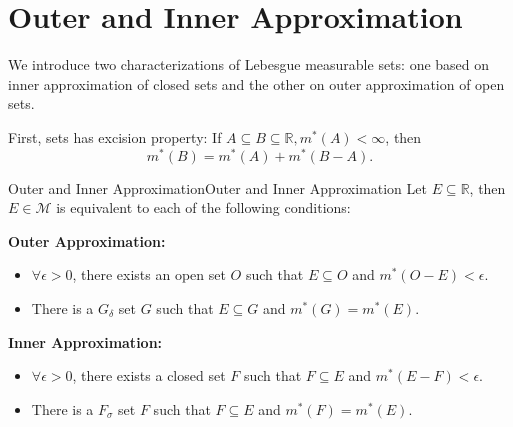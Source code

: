 \documentclass[../main.tex]{subfiles}
\begin{document}
\section{Outer and Inner Approximation}

We introduce two characterizations of Lebesgue measurable sets: one based on inner approximation of closed sets and the other on outer approximation of open sets.

First, sets has excision property: If $A \subseteq B \subseteq \mathbb{R}, m^*(A) < \infty $, then
\begin{equation*}
	m^*(B) = m^*(A) + m^*(B - A).
\end{equation*}

\begin{theorem}{Outer and Inner Approximation}{Outer and Inner Approximation}
Let $E \subseteq \mathbb{R}$, then $E\in \mathcal{M}$ is equivalent to each of the following conditions:

\textbf{Outer Approximation:}
\begin{itemize}
\item $\forall \epsilon>0$, there exists an open set $O$ such that $E \subseteq O$ and $m^*(O-E) < \epsilon$.
\item There is a $G_{\delta}$ set $G$ such that $E \subseteq G$ and $m^*(G) = m^*(E)$.
\end{itemize}

\textbf{Inner Approximation:}
\begin{itemize}
	\item $\forall \epsilon>0$, there exists a closed set $F$ such that $F \subseteq E$ and $m^*(E-F) < \epsilon$.
	\item There is a $F_{\sigma }$ set $F$ such that $F \subseteq E$ and $m^*(F) = m^*(E)$.
\end{itemize}
\end{theorem}
\end{document}
